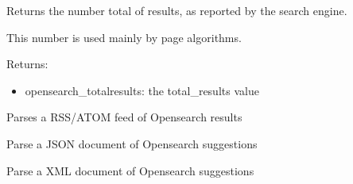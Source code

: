 \documentclass[letterpaper,10pt,english]{sphinxmanual}
\begin{document}
\begin{fulllineitems}
\begin{fulllineitems}
\begin{itemize}
\end{itemize}

\end{fulllineitems}


\begin{fulllineitems}
\label{api3.0:puppy.model.Response.get_totalresults}
Returns the number total of results, as reported by the search engine.

This number is used mainly by page algorithms.

Returns:
\begin{itemize}
\item {} 
opensearch\_totalresults: the total\_results value

\end{itemize}

\end{fulllineitems}


\begin{fulllineitems}
\label{api3.0:puppy.model.Response.parse_feed}
Parses a RSS/ATOM feed of Opensearch results

\end{fulllineitems}


\begin{fulllineitems}
\label{api3.0:puppy.model.Response.parse_json_suggestions}
Parse a JSON document of Opensearch suggestions

\end{fulllineitems}


\begin{fulllineitems}
\label{api3.0:puppy.model.Response.parse_xml_suggestions}
Parse a XML document of Opensearch suggestions

\end{fulllineitems}


\end{fulllineitems}
\end{document}
